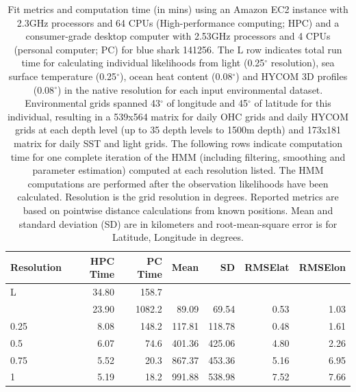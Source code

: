 \begin{table}
\caption{Fit metrics and computation time (in mins) using an Amazon EC2 instance with 2.3GHz processors and 64 CPUs (High-performance computing; HPC) and a consumer-grade desktop computer with 2.53GHz processors and 4 CPUs (personal computer; PC) for blue shark 141256. The L row indicates total run time for calculating individual likelihoods from light (0.25$^{\circ}$ resolution), sea surface temperature (0.25$^{\circ}$), ocean heat content (0.08$^{\circ}$) and HYCOM 3D profiles (0.08$^{\circ}$) in the native resolution for each input environmental dataset. Environmental grids spanned 43$^{\circ}$ of longitude and 45$^{\circ}$ of latitude for this individual, resulting in a 539x564 matrix for daily OHC grids and daily HYCOM grids at each depth level (up to 35 depth levels to 1500m depth) and 173x181 matrix for daily SST and light grids. The following rows indicate computation time for one complete iteration of the HMM (including filtering, smoothing and parameter estimation) computed at each resolution listed. The HMM computations are performed after the observation likelihoods have been calculated. Resolution is the grid resolution in degrees. Reported metrics are based on pointwise distance calculations from known positions. Mean and standard deviation (SD) are in kilometers and root-mean-square error is for Latitude, Longitude in degrees.}
\label{tab:a1t2}
\centering
\begin{tabular}[t]{lrrrrrr}
\toprule
\textbf{Resolution} & \textbf{HPC Time} & \textbf{PC Time} & \textbf{Mean} & \textbf{SD} & \textbf{RMSElat} & \textbf{RMSElon}\\
\midrule
L & 34.80 & 158.7 &  &  &  & \\
\addlinespace
0.08 & 23.90 & 1082.2 & 89.09 & 69.54 & 0.53 & 1.03\\
0.25 & 8.08 & 148.2 & 117.81 & 118.78 & 0.48 & 1.61\\
0.5 & 6.07 & 74.6 & 401.36 & 425.06 & 4.80 & 2.26\\
0.75 & 5.52 & 20.3 & 867.37 & 453.36 & 5.16 & 6.95\\
1 & 5.19 & 18.2 & 991.88 & 538.98 & 7.52 & 7.66\\
\bottomrule
\end{tabular}
\end{table}
